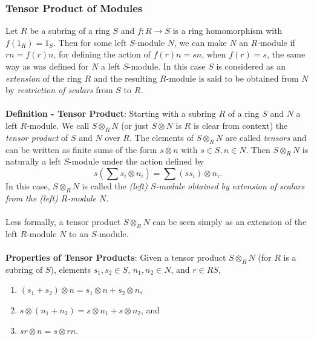 \documentclass{article}
\begin{document}
\subsubsection*{Tensor Product of Modules}
Let $R$ be a subring of a ring $S$ and $f: R \rightarrow S$ is a ring homomorphism with $f(1_R) = 1_S$. Then for some left $S$-module $N$, we can make $N$ an $R$-module if $rn = f(r)n$, for defining the action of $f(r)n = sn$, when $f(r) = s$, the same way as was defined for $N$ a left $S$-module. In this case $S$ is considered as an \textit{extension} of the ring $R$ and the resulting $R$-module is said to be obtained from $N$ by \textit{restriction of scalars} from $S$ to $R$. \\ \\
\textbf{Definition - Tensor Product}: Starting with a subring $R$ of a ring $S$ and $N$ a left $R$-module. We call $S \otimes_R N$ (or just $S \otimes N$ is $R$ is clear from context) the \textit{tensor product} of $S$ and $N$ over $R$. The elements of $S \otimes_R N$ are called \textit{tensors} and can be written as finite sums of the form $s \otimes n$ with $s \in S, n \in N$. Then $S \otimes_R N$ is naturally a left $S$-module under the action defined by $$s \left( \sum s_i \otimes n_i \right) = \sum (ss_i) \otimes n_i.$$ In this case, $S \otimes_R N$ is called the \textit{(left) $S$-module obtained by extension of scalars from the (left) $R$-module $N$}. \\ \\
Less formally, a tensor product $S \otimes_R N$ can be seen simply as an extension of the left $R$-module $N$ to an $S$-module. \\ \\
\textbf{Properties of Tensor Products}: Given a tensor product $S \otimes_R N$ (for $R$ is a subring of $S$), elements $s_1, s_2 \in S$, $n_1, n_2 \in N$, and $r \in R S$, \begin{enumerate}
    \item $(s_1 + s_2) \otimes n = s_1 \otimes n + s_2 \otimes n$,
    \item $s \otimes (n_1 + n_2) = s \otimes n_1 + s \otimes n_2$, and
    \item $sr \otimes n = s \otimes rn$.
\end{enumerate} $ $ \\
\end{document}
